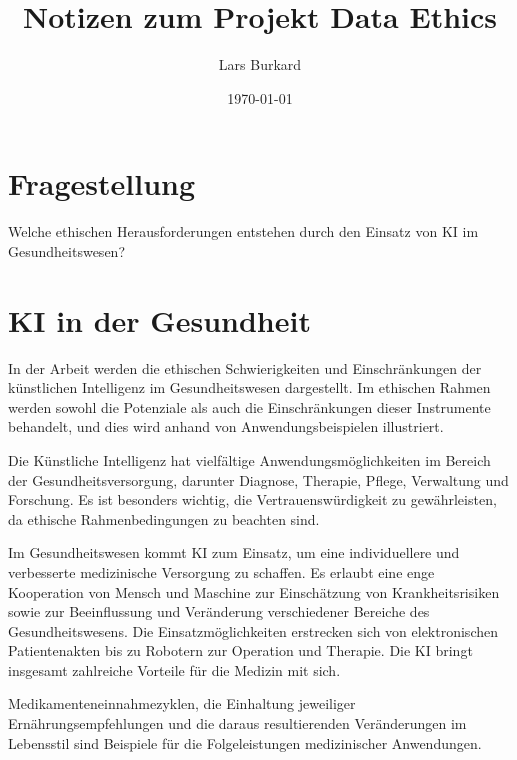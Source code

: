 \documentclass{article}
\title{Notizen zum Projekt Data Ethics}
\author{Lars Burkard}
\date{\today}
\begin{document}
\maketitle


\tableofcontents

\section{Fragestellung
    \label{sec:fragestellung}}


    Welche ethischen Herausforderungen entstehen durch den Einsatz von KI im Gesundheitswesen?

\section{KI in der Gesundheit}
In der Arbeit werden die ethischen Schwierigkeiten und Einschränkungen der künstlichen Intelligenz im Gesundheitswesen dargestellt. Im ethischen Rahmen werden sowohl die Potenziale als auch die Einschränkungen dieser Instrumente behandelt, und dies wird anhand von Anwendungsbeispielen illustriert.

\vspace{2mm}Die Künstliche Intelligenz hat vielfältige Anwendungsmöglichkeiten im Bereich der Gesundheitsversorgung, darunter Diagnose, Therapie, Pflege, Verwaltung und Forschung. Es ist besonders wichtig, die Vertrauenswürdigkeit zu gewährleisten, da ethische Rahmenbedingungen zu beachten sind.

\vspace{27mm}Im Gesundheitswesen kommt KI zum Einsatz, um eine individuellere und verbesserte medizinische Versorgung zu schaffen. Es erlaubt eine enge Kooperation von Mensch und Maschine zur Einschätzung von Krankheitsrisiken sowie zur Beeinflussung und Veränderung verschiedener Bereiche des Gesundheitswesens. Die Einsatzmöglichkeiten erstrecken sich von elektronischen Patientenakten bis zu Robotern zur Operation und Therapie. Die KI bringt insgesamt zahlreiche Vorteile für die Medizin mit sich.

\vspace{2mm}Medikamenteneinnahmezyklen, die Einhaltung jeweiliger Ernährungsempfehlungen und die daraus resultierenden Veränderungen im Lebensstil sind Beispiele für die Folgeleistungen medizinischer Anwendungen. 
\end{document}
